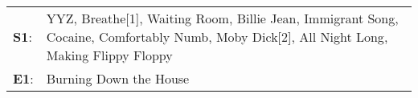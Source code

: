 \begin{supertabular}{p{0.03\textwidth}p{0.92\textwidth}}
 \textbf{S1}:  &  YYZ\textsuperscript{}, \enspace Breathe[1]\textsuperscript{}, \enspace Waiting Room\textsuperscript{}, \enspace Billie Jean\textsuperscript{}, \enspace Immigrant Song\textsuperscript{}, \enspace Cocaine\textsuperscript{}, \enspace Comfortably Numb\textsuperscript{}, \enspace Moby Dick[2]\textsuperscript{}, \enspace All Night Long\textsuperscript{}, \enspace Making Flippy Floppy\textsuperscript{}  \enspace  \\
 \textbf{E1}:  &                                                                                                                                                                                                                                                                                                                                                                        Burning Down the House\textsuperscript{}  \enspace  \\
\end{supertabular}
